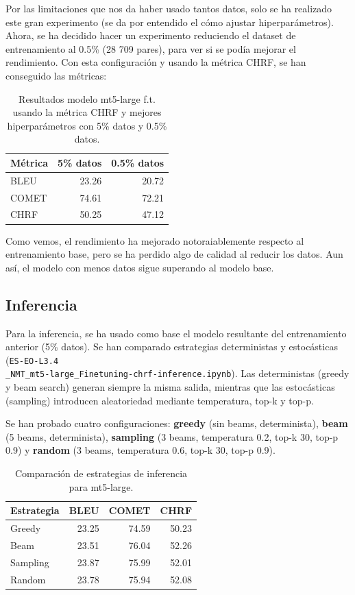 \documentclass[11pt,spanish,listoffigures,listoftables]{tfgetsinf}
\begin{document}
Por las limitaciones que nos da haber usado tantos datos, solo se ha realizado este gran experimento (se da por entendido el cómo ajustar hiperparámetros). Ahora, se ha decidido hacer un experimento reduciendo el dataset de entrenamiento al 0.5\% (28 709 pares), para ver si se podía mejorar el rendimiento. Con esta configuración y usando la métrica CHRF, se han conseguido las métricas:
\begin{table}[H]
\centering
\begin{tabular}{lrr}
	\toprule
	\textbf{Métrica} & \textbf{5\% datos} & \textbf{0.5\% datos}\\
	\midrule
	BLEU & 23.26 & 20.72\\
	COMET & 74.61 & 72.21  \\
	CHRF & 50.25 & 47.12 \\
	\bottomrule
\end{tabular}
\caption{Resultados modelo mt5-large f.t. usando la métrica CHRF y mejores hiperparámetros con 5\% datos y 0.5\% datos.}
\label{tab:mt5_large_chrf}
\end{table}

Como vemos, el rendimiento ha mejorado notoraiablemente respecto al entrenamiento base, pero se ha perdido algo de calidad al reducir los datos. Aun así, el modelo con menos datos sigue superando al modelo base.

\subsection{Inferencia}
Para la inferencia, se ha usado como base el modelo resultante del entrenamiento anterior (5\% datos). Se han comparado estrategias deterministas y estocásticas (\texttt{ES-EO-L3.4\\\_NMT\_mt5-large\_Finetuning-chrf-inference.ipynb}). Las deterministas (greedy y beam search) generan siempre la misma salida, mientras que las estocásticas (sampling) introducen aleatoriedad mediante temperatura, top-k y top-p.

Se han probado cuatro configuraciones: \textbf{greedy} (sin beams, determinista), \textbf{beam} (5 beams, determinista), \textbf{sampling} (3 beams, temperatura 0.2, top-k 30, top-p 0.9) y \textbf{random} (3 beams, temperatura 0.6, top-k 30, top-p 0.9).

\begin{table}[H]
\footnotesize
\centering
\begin{tabular}{lrrr}
	\toprule
	\textbf{Estrategia} & \textbf{BLEU} & \textbf{COMET} & \textbf{CHRF} \\
	\midrule
	Greedy & 23.25 & 74.59 & 50.23 \\
	Beam & 23.51 & 76.04 & 52.26 \\
	Sampling & 23.87 & 75.99 & 52.01 \\
	Random & 23.78 & 75.94 & 52.08 \\
	\bottomrule
\end{tabular}
\caption{Comparación de estrategias de inferencia para mt5-large.}
\label{tab:inference_strategies}
\end{table}
\end{document}
